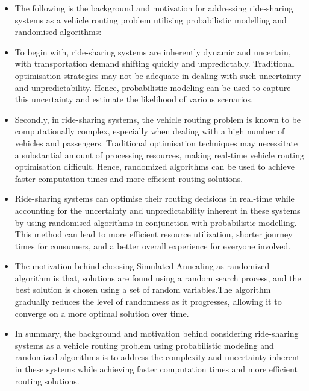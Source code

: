 \documentclass{article}
\begin{document}
\begin{itemize}
    \large
    \item The following is the background and motivation for addressing ride-sharing systems as a vehicle routing problem utilising probabilistic modelling and randomised algorithms:\\
    \item To begin with, ride-sharing systems are inherently dynamic and uncertain, with transportation demand shifting quickly and unpredictably. Traditional optimisation strategies may not be adequate in dealing with such uncertainty and unpredictability. Hence, probabilistic modeling can be used to capture this uncertainty and estimate the likelihood of various scenarios.\\
    \item Secondly, in ride-sharing systems, the vehicle routing problem is known to be computationally complex, especially when dealing with a high number of vehicles and passengers. Traditional optimisation techniques may necessitate a substantial amount of processing resources, making real-time vehicle routing optimisation difficult. Hence, randomized algorithms can be used to achieve faster computation times and more efficient routing solutions.\\
    \item Ride-sharing systems can optimise their routing decisions in real-time while accounting for the uncertainty and unpredictability inherent in these systems by using randomised algorithms in conjunction with probabilistic modelling. This method can lead to more efficient resource utilization, shorter journey times for consumers, and a better overall experience for everyone involved.\\
    \item The motivation behind choosing Simulated Annealing as randomized algorithm is that, solutions are found using a random search process, and the best solution is chosen using a set of random variables.The algorithm gradually reduces the level of randomness as it progresses, allowing it to converge on a more optimal solution over time. \\
    \item In summary, the background and motivation behind considering ride-sharing systems as a vehicle routing problem using probabilistic modeling and randomized algorithms is to address the complexity and uncertainty inherent in these systems while achieving faster computation times and more efficient routing solutions.\\
\end{itemize}
\newpage
\end{document}

